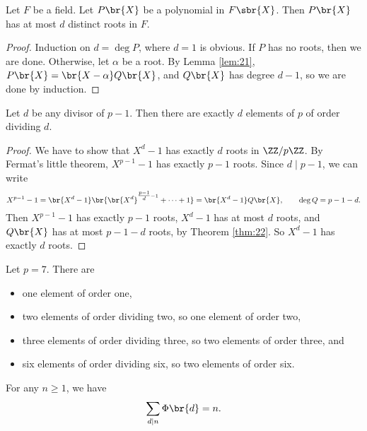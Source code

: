 \begin{theorem}
\label{thm:22}
Let $ F $ be a field. Let $ P\br{X} $ be a polynomial in $ F\sbr{X} $. Then $ P\br{X} $ has at most $ d $ distinct roots in $ F $.
\end{theorem}

\begin{proof}
Induction on $ d = \deg P $, where $ d = 1 $ is obvious. If $ P $ has no roots, then we are done. Otherwise, let $ \alpha $ be a root. By Lemma \ref{lem:21}, $ P\br{X} = \br{X - \alpha}Q\br{X} $, and $ Q\br{X} $ has degree $ d - 1 $, so we are done by induction.
\end{proof}

\begin{corollary}
\label{cor:23}
Let $ d $ be any divisor of $ p - 1 $. Then there are exactly $ d $ elements of $ \unit{p} $ of order dividing $ d $.
\end{corollary}

\begin{proof}
We have to show that $ X^d - 1 $ has exactly $ d $ roots in $ \ZZ / p\ZZ $. By Fermat's little theorem, $ X^{p - 1} - 1 $ has exactly $ p - 1 $ roots. Since $ d \mid p - 1 $, we can write
$$ X^{p - 1} - 1 = \br{X^d - 1}\br{\br{X^d}^{\tfrac{p - 1}{d} - 1} + \dots + 1} = \br{X^d - 1}Q\br{X}, \qquad \deg Q = p - 1 - d. $$
Then $ X^{p - 1} - 1 $ has exactly $ p - 1 $ roots, $ X^d - 1 $ has at most $ d $ roots, and $ Q\br{X} $ has at most $ p - 1 - d $ roots, by Theorem \ref{thm:22}. So $ X^d - 1 $ has exactly $ d $ roots.
\end{proof}

\begin{example*}
Let $ p = 7 $. There are
\begin{itemize}
\item one element of order one,
\item two elements of order dividing two, so one element of order two,
\item three elements of order dividing three, so two elements of order three, and
\item six elements of order dividing six, so two elements of order six.
\end{itemize}
\end{example*}

\begin{lemma}
\label{lem:24}
For any $ n \ge 1 $, we have
$$ \sum_{d \mid n} \Phi\br{d} = n. $$
\end{lemma}

